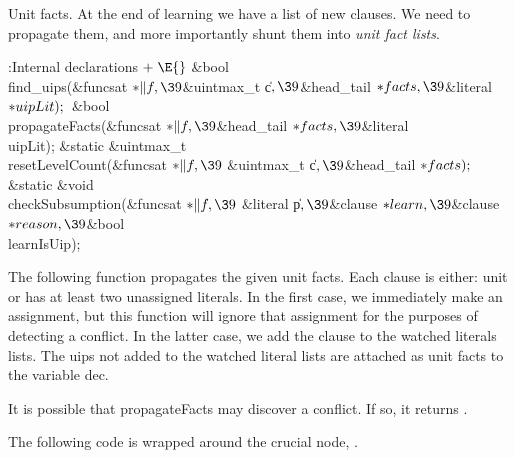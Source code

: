 {{{{{Unit facts. At the end of learning we have a list of new clauses. We
need to
propagate them, and more importantly shunt them into {\it unit fact lists}.

\Y\B\4:Internal declarations\X${}\mathrel+\E{}$\6
\&{bool} \\{find\_uips}(\&{funcsat} ${}{*}\|f,\39{}$\&{uintmax\_t} \|c${},%
\39{}$\&{head\_tail} ${}{*}\\{facts},\39{}$\&{literal} ${}{*}\\{uipLit});{}$\6
\&{bool} \\{propagateFacts}(\&{funcsat} ${}{*}\|f,\39{}$\&{head\_tail} ${}{*}%
\\{facts},\39{}$\&{literal} \\{uipLit});\6
\&{static} \&{uintmax\_t} \\{resetLevelCount}(\&{funcsat} ${}{*}\|f,\39{}$%
\&{uintmax\_t} \|c${},\39{}$\&{head\_tail} ${}{*}\\{facts});{}$\6
\&{static} \&{void} \\{checkSubsumption}(\&{funcsat} ${}{*}\|f,\39{}$%
\&{literal} \|p${},\39{}$\&{clause} ${}{*}\\{learn},\39{}$\&{clause} ${}{*}%
\\{reason},\39{}$\&{bool} \\{learnIsUip});\par
\fi

The following function propagates the given unit facts.  Each clause is
either:
%
\numberedlist
\li unit
\li or has at least two unassigned literals.
\endnumberedlist In the first case, we immediately make an assignment, but this
function will
ignore that assignment for the purposes of detecting a conflict.  In the latter
case, we add the clause to the watched literals lists.  The uips not added to
the watched literal lists are attached as unit facts to the variable dec.

It is possible that propagateFacts may discover a conflict.  If so, it returns
.


\fi

The following code is wrapped around the crucial node, .

}}}}}

